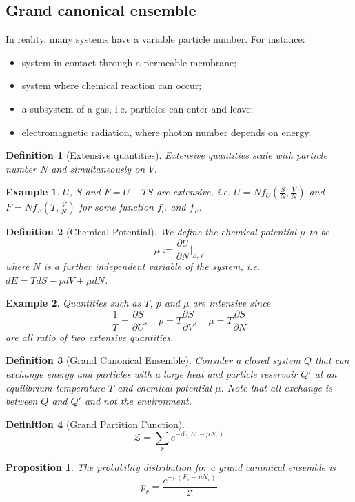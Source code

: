 \documentclass[a4paper]{article}
\newtheorem{eg}{Example}[section]
\theoremstyle{new}
\newtheorem{defi}{Definition}[section]
\newtheorem{prop}{Proposition}[section]
\begin{document}
\subsection{Grand canonical ensemble}
In reality, many systems have a variable particle number. For instance:
\begin{itemize}
    \item system in contact through a permeable membrane;
    \item system where chemical reaction can occur;
    \item a subsystem of a gas, i.e. particles can enter and leave;
    \item electromagnetic radiation, where photon number depends on energy.
\end{itemize}
\begin{defi}[Extensive quantities]
Extensive quantities scale with particle number $N$ and simultaneously on $V$.
\end{defi}
\begin{eg}
 $U$, $S$ and $F=U-TS$ are extensive, i.e. $U=Nf_U(\frac{S}{N},\frac{V}{N})$ and $F=Nf_F(T,\frac{V}{N})$ for some function $f_U$ and $f_F$.
\end{eg}
\begin{defi}[Chemical Potential]
We define the chemical potential $\mu$ to be
$$\mu:=\frac{\partial U}{\partial N}\bigg|_{S,V}$$
where $N$ is a further independent variable of the system, i.e. $dE=TdS-pdV+\mu dN$.
\end{defi}
\begin{eg}
Quantities such as $T$, $p$ and $\mu$ are intensive since
$$\frac{1}{T}=\frac{\partial S}{\partial U},\quad p=T\frac{\partial S}{\partial V},\quad\mu=T\frac{\partial S}{\partial N}$$
are all ratio of two extensive quantities.
\end{eg}
\begin{defi}[Grand Canonical Ensemble]
Consider a closed system $Q$ that can exchange energy and particles with a large heat and particle reservoir $Q'$ at an equilibrium temperature $T$ and chemical potential $\mu$. Note that all exchange is between $Q$ and $Q'$ and not the environment.
\end{defi}
\begin{defi}[Grand Partition Function]
$$\mathcal{Z}=\sum_re^{-\beta(E_r-\mu N_r)}$$
\end{defi}
\begin{prop}
The probability distribution for a grand canonical ensemble is
$$p_r=\frac{e^{-\beta(E_r-\mu N_r)}}{\mathcal{Z}}$$
\end{prop}
\end{document}
